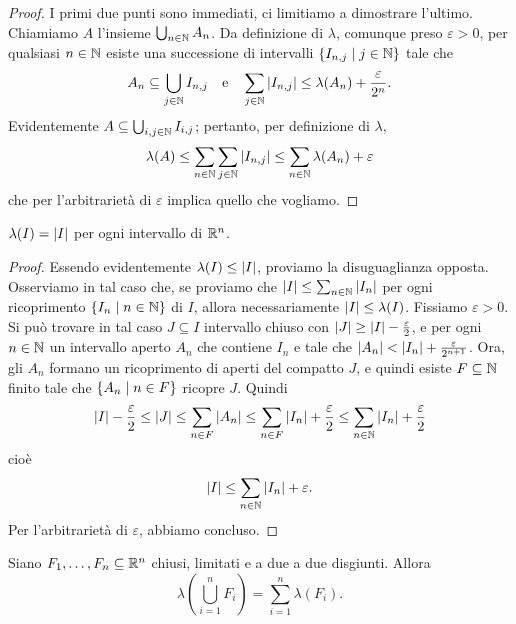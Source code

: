 \begin{proof}
I primi due punti sono immediati, ci limitiamo a dimostrare l'ultimo. Chiamiamo \(A\) l'insieme \(\bigcup_{n \in \mathbb N} A_n\). Da definizione di \(\lambda\), comunque preso \(\varepsilon >0\), per qualsiasi \(n \in \mathbb N\) esiste una successione di intervalli \(\left\{I_{n, j} \mid j \in \mathbb N\right\}\) tale che
\[A_n \subseteq \bigcup_{j \in \mathbb N} I_{n, j} \quad \text{e} \quad \sum_{j \in \mathbb N} \left\lvert I_{n, j}\right\rvert \le \lambda(A_n) + \frac{\varepsilon}{2^n}.\]
Evidentemente \(A \subseteq \bigcup_{i, j \in \mathbb N} I_{i, j}\); pertanto, per definizione di \(\lambda\),
\[\lambda(A) \le \sum_{n \in \mathbb N} \sum_{j \in \mathbb N} \left\lvert I_{n,j}\right\rvert \le \sum_{n \in \mathbb N} \lambda(A_n) + \varepsilon\]
che per l'arbitrarietà di \(\varepsilon\) implica quello che vogliamo.
\end{proof}

\begin{proposizione}
\(\lambda(I) = \left\lvert I\right\rvert\) per ogni intervallo di \(\mathbb R^n\).
\end{proposizione}

\begin{proof}
Essendo evidentemente \(\lambda(I) \le \left\lvert I\right\rvert\), proviamo la disuguaglianza opposta. Osserviamo in tal caso che, se proviamo che \(\left\lvert I\right\rvert \le \sum_{n \in \mathbb N} \left\lvert I_n\right\rvert\) per ogni ricoprimento \(\left\{I_n \mid n \in \mathbb N\right\}\) di \(I\), allora necessariamente \(\left\lvert I\right\rvert \le \lambda(I)\). \newline
Fissiamo \(\varepsilon>0\). Si può trovare in tal caso \(J \subseteq I\) intervallo chiuso con \(\left\lvert J\right\rvert \ge \left\lvert I\right\rvert -\frac \varepsilon 2\), e per ogni \(n \in \mathbb N\) un intervallo aperto \(A_n\) che contiene \(I_n\) e tale che \(\left\lvert A_n\right\rvert < \left\lvert I_n\right\rvert + \frac \varepsilon {2^{n+1}}\). Ora, gli \(A_n\) formano un ricoprimento di aperti del compatto \(J\), e quindi esiste \(F \subseteq \mathbb N\) finito tale che \(\left\{A_n \mid n \in F\right\}\) ricopre \(J\). Quindi
\[\left\lvert I\right\rvert - \frac \varepsilon 2 \le \left\lvert J\right\rvert \le \sum_{n \in F} \left\lvert A_n\right\rvert \le \sum_{n \in F} \left\lvert I_n\right\rvert + \frac \varepsilon 2 \le \sum_{n \in \mathbb N} \left\lvert I_n\right\rvert + \frac \varepsilon 2\]
cioè
\[\left\lvert I\right\rvert \le \sum_{n \in \mathbb N} \left\lvert I_n\right\rvert + \varepsilon .\]
Per l'arbitrarietà di \(\varepsilon\), abbiamo concluso.
\end{proof}

\begin{lemma}
Siano \(F_1, \dots{}, F_n \subseteq \mathbb R^n\) chiusi, limitati e a due a due disgiunti. Allora
\[\lambda \left(\bigcup_{i=1}^n F_i\right) = \sum_{i=1}^n \lambda (F_i) .\]
\end{lemma}


